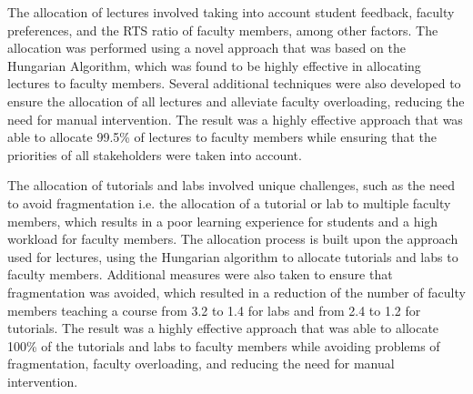 The allocation of lectures involved taking into account student feedback, faculty preferences, and the RTS ratio of faculty members, among other factors. The allocation was performed using a novel approach that was based on the Hungarian Algorithm, which was found to be highly effective in allocating lectures to faculty members. Several additional techniques were also developed to ensure the allocation of all lectures and alleviate faculty overloading, reducing the need for manual intervention. The result was a highly effective approach that was able to allocate 99.5\% of lectures to faculty members while ensuring that the priorities of all stakeholders were taken into account.

The allocation of tutorials and labs involved unique challenges, such as the need to avoid fragmentation i.e. the allocation of a tutorial or lab to multiple faculty members, which results in a poor learning experience for students and a high workload for faculty members. The allocation process is built upon the approach used for lectures, using the Hungarian algorithm to allocate tutorials and labs to faculty members. Additional measures were also taken to ensure that fragmentation was avoided, which resulted in a reduction of the number of faculty members teaching a course from 3.2 to 1.4 for labs and from 2.4 to 1.2 for tutorials. The result was a highly effective approach that was able to allocate 100\% of the tutorials and labs to faculty members while avoiding problems of fragmentation, faculty overloading, and reducing the need for manual intervention.

